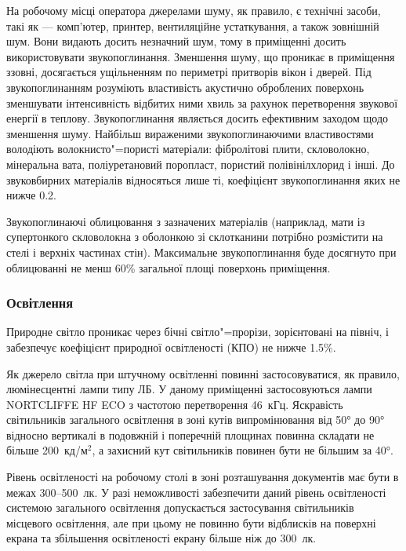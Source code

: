 \documentclass[simple,14pt,utf8,ukrainian]{eskdtext}
\begin{document}
      На робочому місці оператора джерелами шуму, як правило, є технічні
      засоби, такі як --- комп'ютер, принтер, вентиляційне устаткування, а
      також зовнішній шум.
      Вони видають досить незначний шум, тому в приміщенні досить
      використовувати звукопоглинання.
      Зменшення шуму, що проникає в приміщення ззовні, досягається ущільненням
      по периметрі притворів вікон і дверей.
      Під звукопоглинанням розуміють властивість акустично оброблених
      поверхонь зменшувати інтенсивність відбитих ними хвиль за рахунок
      перетворення звукової енергії в теплову.
      Звукопоглинання являється досить ефективним заходом щодо зменшення шуму.
      Найбільш вираженими звукопоглинаючими властивостями володіють
      волокнисто"=пористі матеріали: фібролітові плити, скловолокно,
      мінеральна вата, поліуретановий поропласт, пористий полівінілхлорид і
      інші.
      До звуковбирних матеріалів відносяться лише ті, коефіцієнт
      звукопоглинання яких не нижче \num{0.2}.

      Звукопоглинаючі облицювання з зазначених матеріалів (наприклад, мати із
      супертонкого скловолокна з оболонкою зі склотканини потрібно розмістити
      на стелі і верхніх частинах стін).
      Максимальне звукопоглинання буде досягнуто при облицюванні не менш
      \num{60}\% загальної площі поверхонь приміщення.
    \subsubsection{Освітлення}
      Природне світло проникає через бічні світло"=прорізи, зорієнтовані на
      північ, і забезпечує коефіцієнт природної освітленості (КПО) не нижче
      \num{1.5}\%.

      Як джерело світла при штучному освітленні повинні застосовуватися, як
      правило, люмінесцентні лампи типу ЛБ.
      У даному приміщенні застосовуються лампи NORTCLIFFE HF ECO з частотою
      перетворення \num{46}~кГц.
      Яскравість світильників загального освітлення в зоні кутів
      випромінювання від \ang{50} до \ang{90} відносно вертикалі в подовжній і
      поперечній площинах повинна складати не більше \num{200}~кд/м$^2$, а
      захисний кут світильників повинен бути не більшим за \ang{40}\cite{dbn}.

      Рівень освітленості на робочому столі в зоні розташування документів має
      бути в межах \num{300}--\num{500}~лк.
      У разі неможливості забезпечити даний рівень освітленості системою
      загального освітлення допускається застосування світильників місцевого
      освітлення, але при цьому не повинно бути відблисків на поверхні екрана
      та збільшення освітленості екрану більше ніж до \num{300}~лк.
\end{document}
